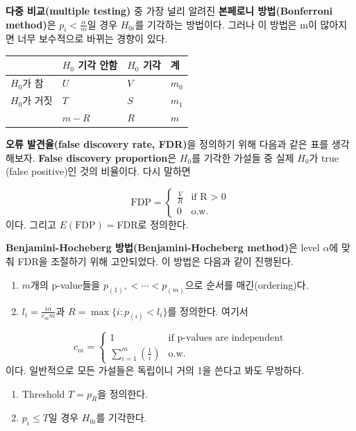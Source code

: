 \documentclass[b5paper,]{scrbook}
\theoremstyle{plain}
\theoremstyle{definition}
\numberwithin{equation}{section}
\begin{document}
\textbf{다중 비교(multiple testing)} 중 가장 널리 알려진 \textbf{본페로니 방법(Bonferroni method)}은 \(p_{i} < \frac{\alpha}{m}\)일 경우 \(H_{0i}\)를 기각하는 방법이다. 그러나 이 방법은 m이 많아지면 너무 보수적으로 바뀌는 경향이 있다.

\begin{longtable}[]{@{}llll@{}}
\toprule
& \(H_{0}\) 기각 안함 & \(H_{0}\) 기각 & 계\tabularnewline
\midrule
\endhead
\(H_{0}\)가 참 & \(U\) & \(V\) & \(m_{0}\)\tabularnewline
\(H_{0}\)가 거짓 & \(T\) & \(S\) & \(m_{1}\)\tabularnewline
& \(m-R\) & \(R\) & \(m\)\tabularnewline
\bottomrule
\end{longtable}

\textbf{오류 발견율(false discovery rate, FDR)}을 정의하기 위해 다음과 같은 표를 생각해보자. \textbf{False discovery proportion}은 \(H_{0}\)를 기각한 가설들 중 실제 \(H_{0}\)가 true (false positive)인 것의 비율이다. 다시 말하면

\[
\text{FDP}=
\begin{cases}
\frac{V}{R} & \text{if R $>$ 0}\\
0 & \text{o.w.}
\end{cases}
\]
이다. 그리고 \(E(\text{FDP})=\)FDR로 정의한다.

\textbf{Benjamini-Hocheberg 방법(Benjamini-Hocheberg method)}은 level \(\alpha\)에 맞춰 FDR을 조절하기 위해 고안되었다. 이 방법은 다음과 같이 진행된다.

\begin{enumerate}
\def\labelenumi{\arabic{enumi}.}
\item
  \(m\)개의 p-value들을 \(p_{(1)}, < \cdots < p_{(m)}\)으로 순서를 매긴(ordering)다.
\item
  \(l_{i}=\frac{i\alpha}{c_{m}m}\)과 \(R=\max \{i: p_{(i)}< l_{i}\}\)를 정의한다. 여기서
\end{enumerate}

\[
c_{m}=
\begin{cases}
1 & \text{if p-values are independent}\\
\sum_{i=1}^{m}(\frac{1}{i}) & \text{o.w.}
\end{cases}
\]
이다. 일반적으로 모든 가설들은 독립이니 거의 1을 쓴다고 봐도 무방하다.

\begin{enumerate}
\def\labelenumi{\arabic{enumi}.}
\setcounter{enumi}{2}
\item
  Threshold \(T=p_{R}\)을 정의한다.
\item
  \(p_{i} \leq T\)일 경우 \(H_{0i}\)를 기각한다.
\end{enumerate}
\end{document}

